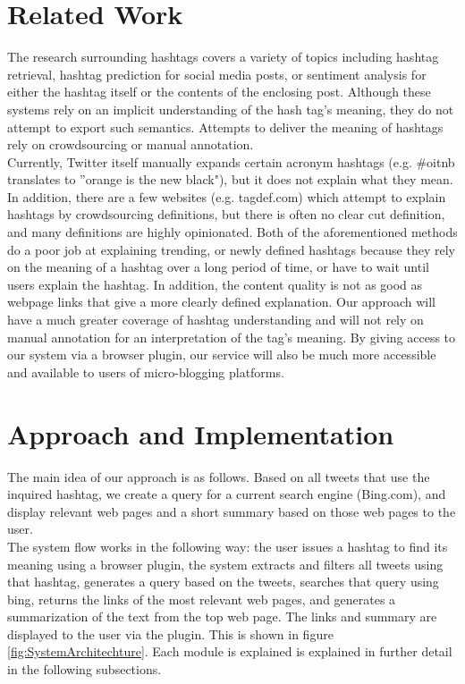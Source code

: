 \documentclass{sig-alternate}
\begin{document}
\section{Related Work}
The research surrounding hashtags covers a variety of topics including hashtag retrieval\cite{efron:retrieval}, hashtag prediction\cite{khabiri:predict}\cite{tagspace} for social media posts, or sentiment analysis for either the hashtag itself or the contents of the enclosing post.  Although these systems rely on an implicit understanding of the hash tag's meaning, they do not attempt to export such semantics.  Attempts to deliver the meaning of hashtags rely on crowdsourcing or manual annotation.\\
Currently, Twitter itself manually expands certain acronym hashtags (e.g. \#oitnb translates to ''orange is the new black"), but it does not explain what they mean. In addition, there are a few websites (e.g. tagdef.com) which attempt to explain hashtags by crowdsourcing definitions, but there is often no clear cut definition, and many definitions are highly opinionated. Both of the aforementioned methods do a poor job at explaining trending, or newly defined hashtags because they rely on the meaning of a hashtag over a long period of time, or have to wait until users explain the hashtag. In addition, the content quality is not as good as webpage links that give a more clearly defined explanation.
Our approach will have a much greater coverage of hashtag understanding and will not rely on manual annotation for an interpretation of the tag's meaning.  By giving access to our system via a browser plugin, our service will also be much more accessible and available to users of micro-blogging platforms.\\

\section{Approach and Implementation}

The main idea of our approach is as follows. Based on all tweets that use the inquired hashtag, we create a query for a current search engine (Bing.com), and display relevant web pages and a short summary based on those web pages to the user. \\
The system flow works in the following way: the user issues a hashtag to find its meaning using a browser plugin, the system extracts and filters all tweets using that hashtag, generates a query based on the tweets, searches that query using bing, returns the links of the most relevant web pages, and generates a summarization of the text from the top web page. The links and summary are displayed to the user via the plugin. This is shown in figure \ref{fig:SystemArchitechture}. Each module is explained is explained in further detail in the following subsections.
\end{document}

